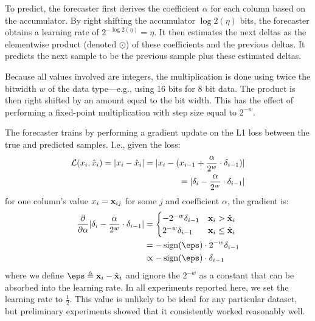 To predict, the forecaster first derives the coefficient $\alpha$ for each column based on the accumulator. By right shifting the accumulator $\log2(\eta)$ bits, the forecaster obtains a learning rate of $2^{-\log2(\eta)} = \eta$. It then estimates the next deltas as the elementwise product (denoted $\odot$) of these coefficients and the previous deltas. It predicts the next sample to be the previous sample plus these estimated deltas.

Because all values involved are integers, the multiplication is done using twice the bitwidth $w$ of the data type---e.g., using 16 bits for 8 bit data. The product is then right shifted by an amount equal to the bit width. This has the effect of performing a fixed-point multiplication with step size equal to $2^{-w}$.

The forecaster trains by performing a gradient update on the L1 loss between the true and predicted samples. I.e., given the loss:
\begin{align}
    \mathcal{L}(x_i, \hat{x}_{i}) = \lvert x_i - \hat{x}_i\rvert
    = \lvert x_i - (x_{i-1} + \frac{\alpha}{2^w} \cdot \delta_{i-1})\rvert \\
    = \lvert\delta_{i} - \frac{\alpha}{2^w} \cdot \delta_{i-1}\rvert
\end{align}
for one column's value $x_i = \mathbf{x}_{ij}$ for some $j$ and coefficient $\alpha$, the gradient is:
\begin{align}
        \frac{\partial }{\partial \alpha} \abs{\delta_{i} - \frac{\alpha}{2^w} \cdot \delta_{i-1}}
&= \begin{cases}
        -{2^{-w}}\vdelta_{i-1} & \x_{i} > \hat{\x}_{i} \\
        {2^{-w}}\vdelta_{i-1} & \x_{i} \le \hat{\x}_{i}
\end{cases} \\
&= -\sign(\eps) \cdot {2^{-w}}\vdelta_{i-1} \\
&\propto -\sign(\eps) \cdot \vdelta_{i-1}
\end{align}
where we define $\eps \triangleq \x_{i} - \hat{\x}_{i}$ and ignore the $2^{-w}$ as a constant that can be absorbed into the learning rate. In all experiments reported here, we set the learning rate to $\frac{1}{2}$. This value is unlikely to be ideal for any particular dataset, but preliminary experiments showed that it consistently worked reasonably well. %

